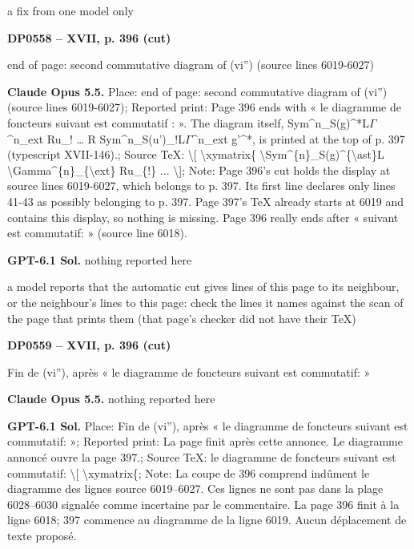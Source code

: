 a fix from one model only\par
\par\noindent\hypertarget{DP0558}{}\textbf{DP0558 -- XVII, p. 396 (cut)}\par
end of page: second commutative diagram of (vi'') (source lines 6019-6027)\par
\textbf{Claude Opus 5.5.} Place: end of page: second commutative diagram of (vi'') (source lines 6019-6027); Reported print: Page 396 ends with « le diagramme de foncteurs suivant est commutatif : ». The diagram itself, Sym\textasciicircum{}n\_S(g)\textasciicircum{}*L\ensuremath{\Gamma}\textasciicircum{}n\_ext Ru\_! … R Sym\textasciicircum{}n\_S(u')\_!L\ensuremath{\Gamma}\textasciicircum{}n\_ext g'\textasciicircum{}*, is printed at the top of p. 397 (typescript XVII-146).; Source TeX: \textbackslash{}[ \textbackslash{}xymatrix\{ \textbackslash{}Sym\textasciicircum{}\{n\}\_S(g)\textasciicircum{}\{\textbackslash{}ast\}L \textbackslash{}Gamma\textasciicircum{}\{n\}\_\{\textbackslash{}ext\} Ru\_\{!\} ... \textbackslash{}]; Note: Page 396's cut holds the display at source lines 6019-6027, which belongs to p. 397. Its first line declares only lines 41-43 as possibly belonging to p. 397. Page 397's TeX already starts at 6019 and contains this display, so nothing is missing. Page 396 really ends after « suivant est commutatif: » (source line 6018).\par
\textbf{GPT-6.1 Sol.} nothing reported here\par
a model reports that the automatic cut gives lines of this page to its neighbour, or the neighbour's lines to this page: check the lines it names against the scan of the page that prints them (that page's checker did not have their TeX)\par
\par\noindent\hypertarget{DP0559}{}\textbf{DP0559 -- XVII, p. 396 (cut)}\par
Fin de (vi''), après « le diagramme de foncteurs suivant est commutatif: »\par
\textbf{Claude Opus 5.5.} nothing reported here\par
\textbf{GPT-6.1 Sol.} Place: Fin de (vi''), après « le diagramme de foncteurs suivant est commutatif: »; Reported print: La page finit après cette annonce. Le diagramme annoncé ouvre la page 397.; Source TeX: le diagramme de foncteurs suivant est commutatif: \textbackslash{}[ \textbackslash{}xymatrix\{; Note: La coupe de 396 comprend indûment le diagramme des lignes source 6019–6027. Ces lignes ne sont pas dans la plage 6028–6030 signalée comme incertaine par le commentaire. La page 396 finit à la ligne 6018; 397 commence au diagramme de la ligne 6019. Aucun déplacement de texte proposé.\par
